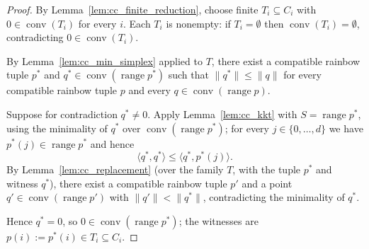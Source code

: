 \begin{proof}
\leanok
By Lemma~\ref{lem:cc_finite_reduction}, choose finite
\(T_i \subseteq C_i\) with \(0 \in \operatorname{conv}(T_i)\) for every
\(i\). Each \(T_i\) is nonempty: if \(T_i = \emptyset\) then
\(\operatorname{conv}(T_i) = \emptyset\), contradicting
\(0 \in \operatorname{conv}(T_i)\).

By Lemma~\ref{lem:cc_min_simplex} applied to \(T\), there exist a
compatible rainbow tuple \(p^{*}\) and
\(q^{*} \in \operatorname{conv}(\operatorname{range} p^{*})\) such
that \(\|q^{*}\| \le \|q\|\) for every compatible rainbow tuple \(p\)
and every \(q \in \operatorname{conv}(\operatorname{range} p)\).

Suppose for contradiction \(q^{*} \neq 0\). Apply
Lemma~\ref{lem:cc_kkt} with \(S = \operatorname{range} p^{*}\),
using the minimality of \(q^{*}\) over
\(\operatorname{conv}(\operatorname{range} p^{*})\); for every
\(j \in \{0, \dots, d\}\) we have
\(p^{*}(j) \in \operatorname{range} p^{*}\) and hence
\[
\langle q^{*}, q^{*} \rangle \le \langle q^{*}, p^{*}(j) \rangle.
\]
By Lemma~\ref{lem:cc_replacement} (over the family \(T\), with the
tuple \(p^{*}\) and witness \(q^{*}\)), there exist a compatible
rainbow tuple \(p'\) and a point
\(q' \in \operatorname{conv}(\operatorname{range} p')\) with
\(\|q'\| < \|q^{*}\|\), contradicting the minimality of \(q^{*}\).

Hence \(q^{*} = 0\), so
\(0 \in \operatorname{conv}(\operatorname{range} p^{*})\); the
witnesses are \(p(i) := p^{*}(i) \in T_i \subseteq C_i\).
\end{proof}


